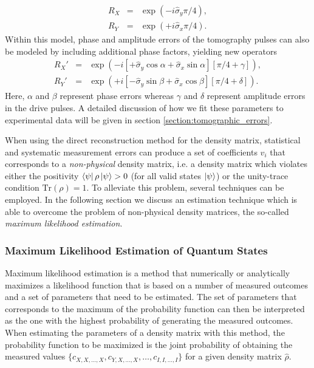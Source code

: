 %
\begin{eqnarray}
R_{X} & = & \exp{\left( -i \hat{\sigma}_y \pi / 4\right)}, \\
R_{Y} & = & \exp{\left( +i \hat{\sigma}_x \pi / 4\right)}. 
\end{eqnarray}
%
Within this model, phase and amplitude errors of the tomography pulses can also be modeled by including additional phase factors, yielding new operators
%
\begin{eqnarray}
R_{X}' & = & \exp{\left( -i \left[+\hat{\sigma}_y\cos{\alpha}+\hat{\sigma}_x\sin{\alpha} \right] \left[\pi / 4+\gamma\right]\right)}, \\
R_{Y}' & = & \exp{\left( +i \left[-\hat{\sigma}_y\sin{\beta}+\hat{\sigma}_x\cos{\beta}\right] \left[\pi / 4+\delta\right]\right)}. 
\end{eqnarray}
%
Here, $\alpha$ and $\beta$ represent phase errors whereas $\gamma$ and $\delta$ represent amplitude errors in the drive pulses. A detailed discussion of how we fit these parameters to experimental data will be given in section \ref{section:tomographic_errors}.

\smallskip

When using the direct reconstruction method for the density matrix, statistical and systematic measurement errors can produce a set of coefficients $v_i$ that corresponds to a {\it non-physical} density matrix, i.e. a density matrix which violates either the positivity $\left< \psi \right|\rho\left| \psi \right> > 0$ (for all valid states $\left| \psi \right>$) or the unity-trace condition $\mathrm{Tr}(\rho)=1$. To alleviate this problem, several techniques can be employed. In the following section we discuss an estimation technique which is able to overcome the problem of non-physical density matrices, the so-called {\it maximum likelihood estimation}.

\subsubsection{Maximum Likelihood Estimation of Quantum States}

Maximum likelihood estimation is a method that numerically or analytically maximizes a likelihood function that is based on a number of measured outcomes and a set of parameters that need to be estimated. The set of parameters that corresponds to the maximum of the probability function can then be interpreted as the one with the highest probability of generating the measured outcomes. When estimating the parameters of a density matrix with this method, the probability function to be maximized is the joint probability of obtaining the measured values $\{c_{X,X,\hdots,X},c_{Y,X,\hdots,X},\hdots,c_{I,I,\hdots,I}\}$ for a given density matrix $\hat{\rho}$. 

